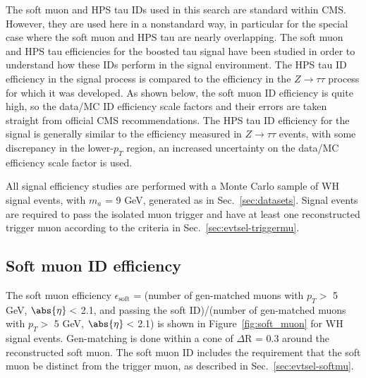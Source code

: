 The soft muon and HPS tau IDs used in this search are standard within CMS.  However, they are used here in a nonstandard way, in particular for the special case where the soft muon and HPS tau are nearly overlapping. %
The soft muon and HPS tau efficiencies for the boosted tau signal have been studied in order to understand how these IDs perform in the signal environment. The HPS tau ID efficiency in the signal process is compared to the efficiency in the $Z\rightarrow\tau\tau$ process for which it was developed.  As shown below, the soft muon ID efficiency is quite high, so the data/MC ID efficiency scale factors and their errors are taken straight from official CMS recommendations. The HPS tau ID efficiency for the signal is generally similar to the efficiency measured in $Z\rightarrow\tau\tau$ events, with some discrepancy in the lower-$p_T$ region, an increased uncertainty on the data/MC efficiency scale factor is used.

All signal efficiency studies are performed with a Monte Carlo sample of WH signal events, with $m_{a}$ = 9 GeV, generated as in Sec.~\ref{sec:datasets}.  Signal events are required to pass the isolated muon trigger and have at least one reconstructed trigger muon according to the criteria in Sec.~\ref{sec:evtsel-triggermu}.

\subsection{Soft muon ID efficiency\label{sec:soft-mu-id}}

The soft muon efficiency $\epsilon_{\text{soft}}$ = (number of gen-matched muons with $p_T >$ 5 GeV, $\abs{\eta} <$ 2.1, and passing the soft ID)/(number of gen-matched muons with $p_T >$ 5 GeV, $\abs{\eta} <$ 2.1) is shown in Figure~\ref{fig:soft_muon} for WH signal events.  Gen-matching is done within a cone of $\Delta$R = 0.3 around the reconstructed soft muon.  The soft muon ID includes the requirement that the soft muon be distinct from the trigger muon, as described in Sec.~\ref{sec:evtsel-softmu}.

